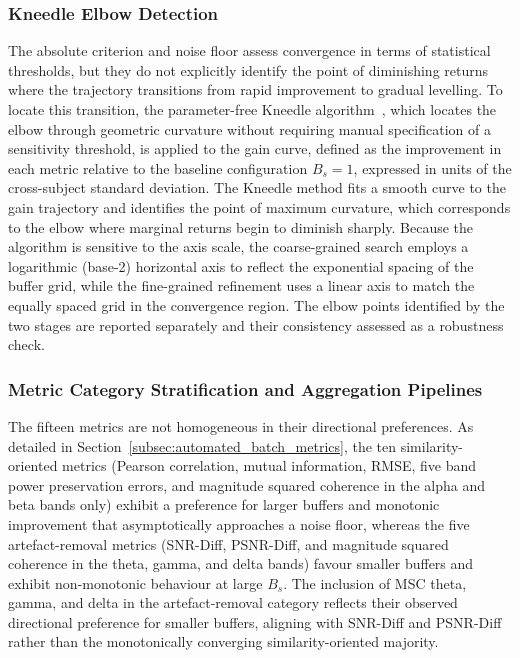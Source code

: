 \documentclass[MScCS,12pt,oneside,final]{uccthesis}
\begin{document}
\subsubsection{Kneedle Elbow Detection}

The absolute criterion and noise floor assess convergence in terms of statistical thresholds, but they do not explicitly identify the point of diminishing returns where the trajectory transitions from rapid improvement to gradual levelling. To locate this transition, the parameter-free Kneedle algorithm~\parencite{satopaa2011finding}, which locates the elbow through geometric curvature without requiring manual specification of a sensitivity threshold, is applied to the gain curve, defined as the improvement in each metric relative to the baseline configuration $B_s = 1$, expressed in units of the cross-subject standard deviation. The Kneedle method fits a smooth curve to the gain trajectory and identifies the point of maximum curvature, which corresponds to the elbow where marginal returns begin to diminish sharply. Because the algorithm is sensitive to the axis scale, the coarse-grained search employs a logarithmic (base-2) horizontal axis to reflect the exponential spacing of the buffer grid, while the fine-grained refinement uses a linear axis to match the equally spaced grid in the convergence region. The elbow points identified by the two  stages are reported separately and their consistency assessed as a robustness check.

\subsubsection{Metric Category Stratification and Aggregation Pipelines}

The fifteen metrics are not homogeneous in their directional preferences. As detailed in Section~\ref{subsec:automated_batch_metrics}, the ten similarity-oriented metrics (Pearson correlation, mutual information, RMSE, five band power preservation errors, and magnitude squared coherence in the alpha and beta bands only) exhibit a preference for larger buffers and monotonic improvement that asymptotically approaches a noise floor, whereas the five artefact-removal metrics (SNR-Diff, PSNR-Diff, and magnitude squared coherence in the theta, gamma, and delta bands) favour smaller buffers and exhibit non-monotonic behaviour at large $B_s$. The inclusion of MSC theta, gamma, and delta in the artefact-removal category reflects their observed directional preference for smaller buffers, aligning with SNR-Diff and PSNR-Diff rather than the monotonically converging similarity-oriented majority.
\end{document}
